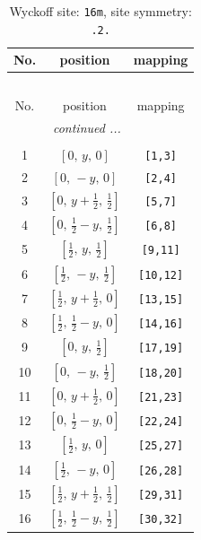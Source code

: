 \documentclass[fleqn,8pt]{jsarticle}
\begin{document}
\renewcommand{\arraystretch}{1.2}
\begin{longtable}{ccc}
\caption{Wyckoff site: {\tt 16m}, site symmetry: {\tt .2.}}
 \\
 \hline \hline
No. & position & mapping \\ \hline \endfirsthead

\multicolumn{2}{l}{\tablename\ \thetable{}} \\
 \hline \hline
No. & position & mapping \\ \hline \endhead

 \hline \hline
\multicolumn{2}{r}{\footnotesize\it continued ...} \\ \endfoot

 \hline \hline
\multicolumn{2}{r}{} \\ \endlastfoot

1 & $\left[ 0,\, y,\, 0 \right]$ & {\tt [1,3]} \\ \hline
2 & $\left[ 0,\, - y,\, 0 \right]$ & {\tt [2,4]} \\ \hline
3 & $\left[ 0,\, y + \frac{1}{2},\, \frac{1}{2} \right]$ & {\tt [5,7]} \\ \hline
4 & $\left[ 0,\, \frac{1}{2} - y,\, \frac{1}{2} \right]$ & {\tt [6,8]} \\ \hline
5 & $\left[ \frac{1}{2},\, y,\, \frac{1}{2} \right]$ & {\tt [9,11]} \\ \hline
6 & $\left[ \frac{1}{2},\, - y,\, \frac{1}{2} \right]$ & {\tt [10,12]} \\ \hline
7 & $\left[ \frac{1}{2},\, y + \frac{1}{2},\, 0 \right]$ & {\tt [13,15]} \\ \hline
8 & $\left[ \frac{1}{2},\, \frac{1}{2} - y,\, 0 \right]$ & {\tt [14,16]} \\ \hline
9 & $\left[ 0,\, y,\, \frac{1}{2} \right]$ & {\tt [17,19]} \\ \hline
10 & $\left[ 0,\, - y,\, \frac{1}{2} \right]$ & {\tt [18,20]} \\ \hline
11 & $\left[ 0,\, y + \frac{1}{2},\, 0 \right]$ & {\tt [21,23]} \\ \hline
12 & $\left[ 0,\, \frac{1}{2} - y,\, 0 \right]$ & {\tt [22,24]} \\ \hline
13 & $\left[ \frac{1}{2},\, y,\, 0 \right]$ & {\tt [25,27]} \\ \hline
14 & $\left[ \frac{1}{2},\, - y,\, 0 \right]$ & {\tt [26,28]} \\ \hline
15 & $\left[ \frac{1}{2},\, y + \frac{1}{2},\, \frac{1}{2} \right]$ & {\tt [29,31]} \\ \hline
16 & $\left[ \frac{1}{2},\, \frac{1}{2} - y,\, \frac{1}{2} \right]$ & {\tt [30,32]} \\
\end{longtable}
\end{document}
